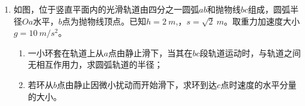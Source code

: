 \begin{enumerate}[leftmargin=0em]
\begin{enumerate}
\end{enumerate}
\begin{figure}[h!]
\flushright

\end{figure}





\newpage
\item
{}
如图，位于竖直平面内的光滑轨道由四分之一圆弧$ ab $和抛物线$ bc $组成，圆弧半径$ Oa $水平，$ b $点为抛物线顶点。已知$ h=2\ m $,，$ s=\sqrt{2} \ m $。取重力加速度大小$ g=10 \ m/s^{2} $。
\begin{enumerate}
\renewcommand{\labelenumi}{\arabic{enumi}.}
\item
一小环套在轨道上从$ a $点由静止滑下，当其在$ bc $段轨道运动时，与轨道之间无相互作用力，求圆弧轨道的半径；
\item 
若环从$ b $点由静止因微小扰动而开始滑下，求环到达$ c $点时速度的水平分量的大小。



\end{enumerate}
\begin{figure}[h!]
\flushright

\end{figure}



\end{enumerate}
